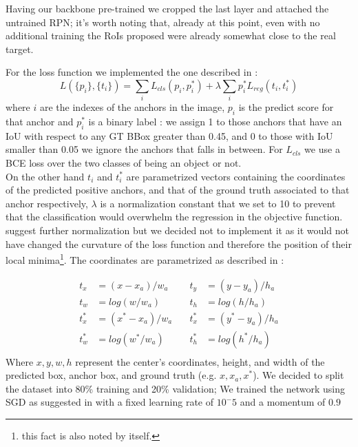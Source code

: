 \documentclass[10pt,journal,cspaper,compsoc]{IEEEtran}
\begin{document}
	Having our backbone pre-trained we cropped the last layer and attached the untrained RPN; it's worth noting that, already at this point, even with no additional training the RoIs proposed were already somewhat close to the real target. 

    For the loss function we implemented the one described in \cite{arxiv:FasterRCNN}:
	\begin{equation}\label{eq:loss}
        L(\{p_i\}, \{t_i\}) = \sum_i  L_{cls}(p_i, p_i^*) +\lambda \sum_i p_i^* L_{reg}(t_i, t_i^*)
    \end{equation}
	where $i$ are the indexes of the anchors in the image, $p_i$ is the predict score for that anchor and $p_i^*$ is a binary label : we assign 1 to those anchors that have an IoU with respect to any GT BBox greater than 0.45, and 0 to those with IoU smaller than 0.05 we ignore the anchors that falls in between. For $L_{cls}$  we use a BCE loss over the two classes of being an object or not. \\On the other hand $t_i$ and $t_i^*$ are parametrized vectors containing the coordinates of the predicted positive anchors, and that of the ground truth associated to that anchor respectively, $\lambda$ is a normalization constant that we set to 10 to prevent that the classification would overwhelm the regression in the objective function. \cite{arxiv:FastRCNN} suggest further normalization but we decided not to implement it as it would not have changed the curvature of the loss function and therefore the position of their local minima\footnote[]{this fact is also noted by \cite{arxiv:FasterRCNN} itself.}. The coordinates are parametrized as described in \cite{arxiv:FasterRCNN} : 

\begin{equation}\label{eq:reg_transf}
\begin{aligned}
t_x &= (x - x_a)/w_a \quad  &t_y &=(y - y_a)/h_a \\
t_w &= log(w/w_a) \quad &t_h &= log (h/h_a) \\
t_x^* &= (x^* - x_a)/w_a \quad &t_x^* &= (y^* - y_a)/h_a \\
t_w^* &= log(w^*/w_a) \quad  &t_h^*  &= log(h^*/h_a) \\
\end{aligned}
\end{equation}
Where $x,y,w,h$ represent the center's coordinates, height, and width of the predicted box, anchor box, and ground truth (e.g. $x, x_a, x^*$). 
We decided to split the dataset into 80\% training and 20\% validation; We trained the network using SGD as suggested in \cite{arxiv:FasterRCNN} with a fixed learning rate of $10^-5$ and a momentum of $0.9$
    
\end{document}
